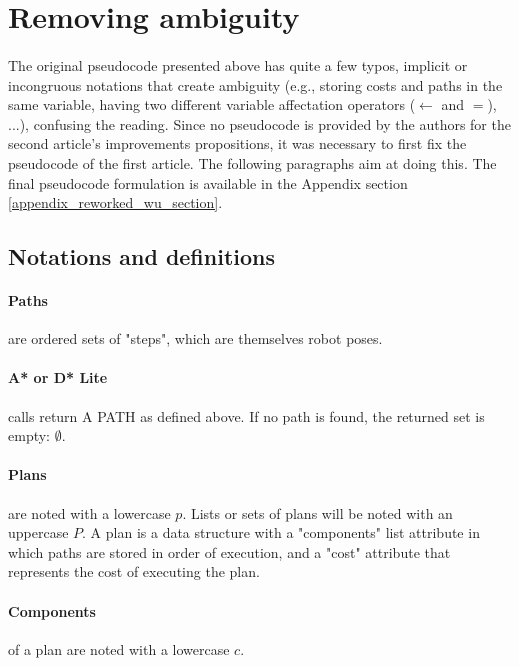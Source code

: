 \section{Removing ambiguity}\label{removing_ambiguity_section}

\paragraph{} The original pseudocode presented above has quite a few typos, implicit or incongruous notations that create ambiguity (e.g., storing costs and paths in the same variable, having two different variable affectation operators ($\gets$ and $=$), ...), confusing the reading. Since no pseudocode is provided by the authors for the second article's improvements propositions, it was necessary to first fix the pseudocode of the first article. The following paragraphs aim at doing this. The final pseudocode formulation is available in the Appendix section \ref{appendix_reworked_wu_section}.

\subsection{Notations and definitions}

\paragraph{Paths} are ordered sets of "steps", which are themselves robot poses.

\paragraph{A* or D* Lite} calls return A PATH as defined above. If no path is found, the returned set is empty: $\emptyset$.

\paragraph{Plans} are noted with a lowercase $p$. Lists or sets of plans will be noted with an uppercase $P$. A plan is a data structure with a "components" list attribute in which paths are stored in order of execution, and a "cost" attribute that represents the cost of executing the plan.

\paragraph{Components} of a plan are noted with a lowercase $c$.

